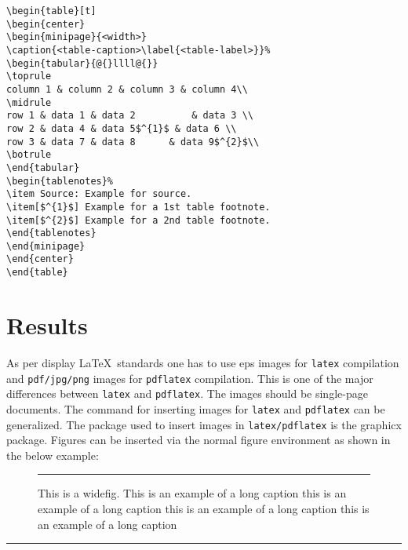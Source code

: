 \documentclass[unnumsec,webpdf,contemporary,large]{oup-authoring-template}%
\theoremstyle{thmstyleone}%
\theoremstyle{thmstyletwo}%
\theoremstyle{thmstylethree}%
\begin{document}
\begin{verbatim}
\begin{table}[t]
\begin{center}
\begin{minipage}{<width>}
\caption{<table-caption>\label{<table-label>}}%
\begin{tabular}{@{}llll@{}}
\toprule
column 1 & column 2 & column 3 & column 4\\
\midrule
row 1 & data 1 & data 2          & data 3 \\
row 2 & data 4 & data 5$^{1}$ & data 6 \\
row 3 & data 7 & data 8      & data 9$^{2}$\\
\botrule
\end{tabular}
\begin{tablenotes}%
\item Source: Example for source.
\item[$^{1}$] Example for a 1st table footnote.
\item[$^{2}$] Example for a 2nd table footnote.
\end{tablenotes}
\end{minipage}
\end{center}
\end{table}
\end{verbatim}

\section{Results}\label{sec6}

As per display \LaTeX\ standards one has to use eps images for \verb+latex+ compilation and \verb+pdf/jpg/png+ images for
\verb+pdflatex+ compilation. This is one of the major differences between \verb+latex+
and \verb+pdflatex+. The images should be single-page documents. The command for inserting images
for \verb+latex+ and \verb+pdflatex+ can be generalized. The package used to insert images in \verb+latex/pdflatex+ is the
graphicx package. Figures can be inserted via the normal figure environment as shown in the below example:


\begin{figure}[!t]%
\centering
{\color{black!20}\rule{213pt}{37pt}}
\caption{This is a widefig. This is an example of a long caption this is an example of a long caption  this is an example of a long caption this is an example of a long caption}\label{fig1}
\end{figure}

\begin{figure*}[!t]%
\centering
{\color{black!20}\rule{438pt}{74pt}}
\caption{This is a widefig. This is an example of a long caption this is an example of a long caption  this is an example of a long caption this is an example of a long caption}\label{fig2}
\end{figure*}
\end{document}

